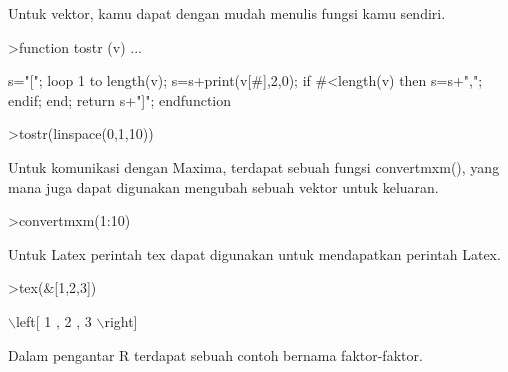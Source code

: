 \documentclass[a4paper,10pt]{article}
\begin{document}
\begin{eulernotebook}
\begin{eulercomment}
\begin{eulercomment}
\begin{eulercomment}
\begin{eulercomment}
\begin{eulercomment}
Untuk vektor, kamu dapat dengan mudah menulis fungsi kamu sendiri.
\end{eulercomment}
\begin{eulerprompt}
>function tostr (v) ...
\end{eulerprompt}
\begin{eulerudf}
  s="[";
  loop 1 to length(v);
     s=s+print(v[#],2,0);
     if #<length(v) then s=s+","; endif;
  end;
  return s+"]";
  endfunction
\end{eulerudf}
\begin{eulerprompt}
>tostr(linspace(0,1,10))
\end{eulerprompt}
\begin{euleroutput}
  [0.00,0.10,0.20,0.30,0.40,0.50,0.60,0.70,0.80,0.90,1.00]
\end{euleroutput}
\begin{eulercomment}
Untuk komunikasi dengan Maxima, terdapat sebuah fungsi convertmxm(),
yang mana juga dapat digunakan mengubah sebuah vektor untuk keluaran.
\end{eulercomment}
\begin{eulerprompt}
>convertmxm(1:10)
\end{eulerprompt}
\begin{euleroutput}
  [1,2,3,4,5,6,7,8,9,10]
\end{euleroutput}
\begin{eulercomment}
Untuk Latex perintah tex dapat digunakan untuk mendapatkan perintah
Latex.
\end{eulercomment}
\begin{eulerprompt}
>tex(&[1,2,3])
\end{eulerprompt}
\begin{euleroutput}
  \(\backslash\)left[ 1 , 2 , 3 \(\backslash\)right] 
\end{euleroutput}
\begin{eulercomment}
Dalam pengantar R terdapat sebuah contoh bernama faktor-faktor.


\end{eulercomment}
\end{eulercomment}
\end{eulercomment}
\end{eulercomment}
\end{eulercomment}
\end{eulernotebook}
\end{document}
